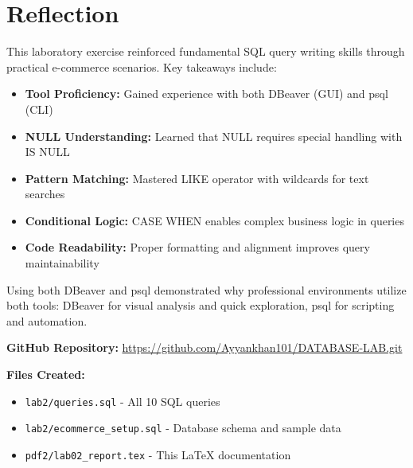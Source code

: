 \documentclass[12pt]{article}
\begin{document}
\section{Reflection}

This laboratory exercise reinforced fundamental SQL query writing skills through practical e-commerce scenarios. Key takeaways include:

\begin{itemize}
    \item \textbf{Tool Proficiency:} Gained experience with both DBeaver (GUI) and psql (CLI)
    \item \textbf{NULL Understanding:} Learned that NULL requires special handling with IS NULL
    \item \textbf{Pattern Matching:} Mastered LIKE operator with wildcards for text searches
    \item \textbf{Conditional Logic:} CASE WHEN enables complex business logic in queries
    \item \textbf{Code Readability:} Proper formatting and alignment improves query maintainability
\end{itemize}

Using both DBeaver and psql demonstrated why professional environments utilize both tools: DBeaver for visual analysis and quick exploration, psql for scripting and automation.

\vspace{0.5cm}
\noindent \textbf{GitHub Repository:} \url{https://github.com/Ayyankhan101/DATABASE-LAB.git}

\vspace{0.5cm}
\noindent \textbf{Files Created:}
\begin{itemize}
    \item \texttt{lab2/queries.sql} - All 10 SQL queries
    \item \texttt{lab2/ecommerce\_setup.sql} - Database schema and sample data
    \item \texttt{pdf2/lab02\_report.tex} - This LaTeX documentation
\end{itemize}
\end{document}
